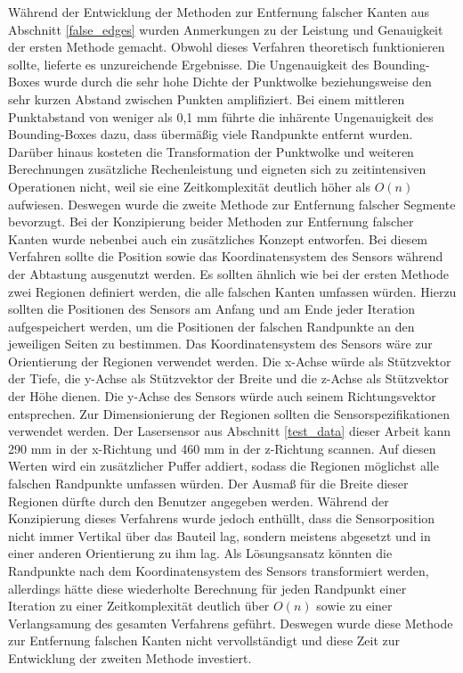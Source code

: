 Während der Entwicklung der Methoden zur Entfernung falscher Kanten aus Abschnitt \ref{false_edges} wurden Anmerkungen zu der Leistung und Genauigkeit der ersten Methode gemacht. Obwohl dieses Verfahren theoretisch funktionieren sollte, lieferte es unzureichende Ergebnisse. Die Ungenauigkeit des Bounding-Boxes wurde durch die sehr hohe Dichte der Punktwolke beziehungsweise den sehr kurzen Abstand zwischen Punkten amplifiziert. Bei einem mittleren Punktabstand von weniger als 0,1 mm führte die inhärente Ungenauigkeit des Bounding-Boxes dazu, dass übermäßig viele Randpunkte entfernt wurden. Darüber hinaus kosteten die Transformation der Punktwolke und weiteren Berechnungen zusätzliche Rechenleistung und eigneten sich zu zeitintensiven Operationen nicht, weil sie eine Zeitkomplexität deutlich höher als $O(n)$ aufwiesen. Deswegen wurde die zweite Methode zur Entfernung falscher Segmente bevorzugt. Bei der Konzipierung beider Methoden zur Entfernung falscher Kanten wurde nebenbei auch ein zusätzliches Konzept entworfen. Bei diesem Verfahren sollte die Position sowie das Koordinatensystem des Sensors während der Abtastung ausgenutzt werden. Es sollten ähnlich wie bei der ersten Methode zwei Regionen definiert werden, die alle falschen Kanten umfassen würden. Hierzu sollten die Positionen des Sensors am Anfang und am Ende jeder Iteration aufgespeichert werden, um die Positionen der falschen Randpunkte an den jeweiligen Seiten zu bestimmen. Das Koordinatensystem des Sensors wäre zur Orientierung der Regionen verwendet werden. Die x-Achse würde als Stützvektor der Tiefe, die y-Achse als Stützvektor der Breite und die z-Achse als Stützvektor der Höhe dienen. Die y-Achse des Sensors würde auch seinem Richtungsvektor entsprechen. Zur Dimensionierung der Regionen sollten die Sensorspezifikationen verwendet werden. Der Lasersensor aus Abschnitt \ref{test_data} dieser Arbeit kann 290 mm in der x-Richtung und 460 mm in der z-Richtung scannen. Auf diesen Werten wird ein zusätzlicher Puffer addiert, sodass die Regionen möglichst alle falschen Randpunkte umfassen würden. Der Ausmaß für die Breite dieser Regionen dürfte durch den Benutzer angegeben werden. Während der Konzipierung dieses Verfahrens wurde jedoch enthüllt, dass die Sensorposition nicht immer Vertikal über das Bauteil lag, sondern meistens abgesetzt und in einer anderen Orientierung zu ihm lag. Als Lösungsansatz könnten die Randpunkte nach dem Koordinatensystem des Sensors transformiert werden, allerdings hätte diese wiederholte Berechnung für jeden Randpunkt einer Iteration zu einer Zeitkomplexität deutlich über $O(n)$ sowie zu einer Verlangsamung des gesamten Verfahrens geführt. Deswegen wurde diese Methode zur Entfernung falschen Kanten nicht vervollständigt und diese Zeit zur Entwicklung der zweiten Methode investiert. 

